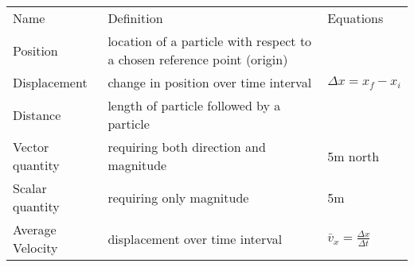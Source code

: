 \documentclass[11pt]{article}
\begin{document}
\begin{tabularx}{\textwidth}{l| X l}
    Name & Definition & Equations \\
    Position & location of a particle with respect to a chosen reference point (origin) & \\
    Displacement & change in position over time interval & $ \Delta x=x_{f} - x_{i} $ \\
    Distance & length of particle followed by a particle & \\
    Vector quantity & requiring both direction and magnitude & 5m north \\
    Scalar quantity & requiring only magnitude & 5m \\
    Average Velocity & displacement over time interval & $ \bar{v}_{x} = \frac{ \Delta x}{ \Delta t } $ \\
\end{tabularx}
\end{document}
